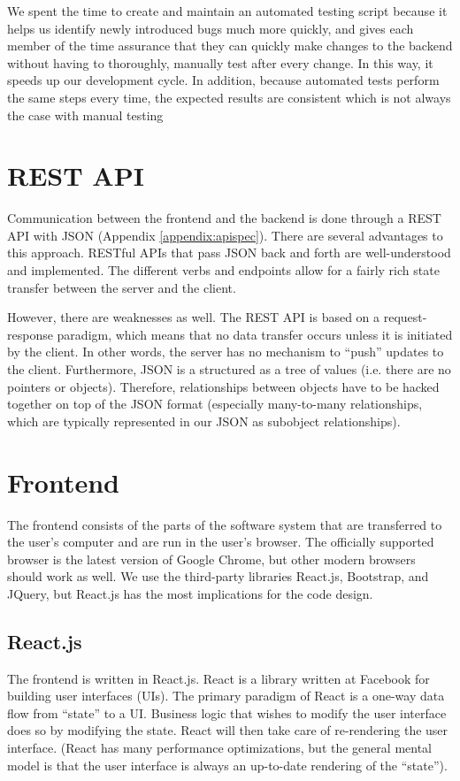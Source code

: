 \documentclass[12pt]{article}
\begin{document}
We spent the time to create and maintain an automated testing script because it helps us identify newly introduced bugs much more quickly, and gives each member of the time assurance that they can quickly make changes to the backend without having to thoroughly, manually test after every change. In this way, it speeds up our development cycle. In addition, because automated tests perform the same steps every time, the expected results are consistent which is not always the case with manual testing

\section{REST API}
Communication between the frontend and the backend is done through a REST API with JSON (Appendix \ref{appendix:apispec}). There are several advantages to this approach. RESTful APIs that pass JSON back and forth are well-understood and implemented. The different verbs and endpoints allow for a fairly rich state transfer between the server and the client.

However, there are weaknesses as well. The REST API is based on a request-response paradigm, which means that no data transfer occurs unless it is initiated by the client. In other words, the server has no mechanism to ``push'' updates to the client. Furthermore, JSON is a structured as a tree of values (i.e. there are no pointers or objects). Therefore, relationships between objects have to be hacked together on top of the JSON format (especially many-to-many relationships, which are typically represented in our JSON as subobject relationships).

\section{Frontend}
The frontend consists of the parts of the software system that are transferred to the user's computer and are run in the user's browser. The officially supported browser is the latest version of Google Chrome, but other modern browsers should work as well. We use the third-party libraries React.js, Bootstrap, and JQuery, but React.js has the most implications for the code design.

\subsection{React.js}
The frontend is written in React.js. React is a library written at Facebook for building user interfaces (UIs). The primary paradigm of React is a one-way data flow from ``state'' to a UI. Business logic that wishes to modify the user interface does so by modifying the state. React will then take care of re-rendering the user interface. (React has many performance optimizations, but the general mental model is that the user interface is always an up-to-date rendering of the ``state'').
\end{document}
